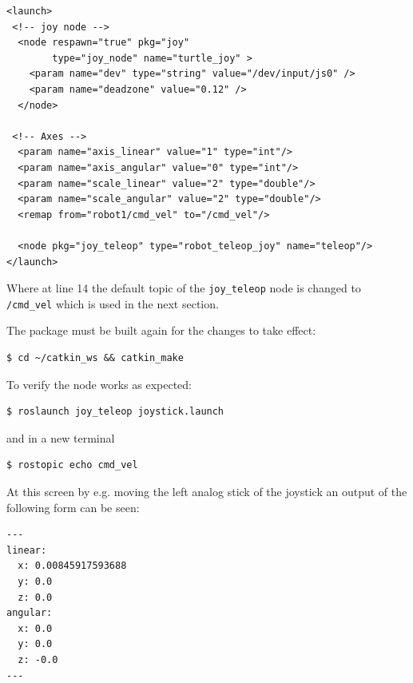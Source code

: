\begin{verbatim}
<launch>
 <!-- joy node -->
  <node respawn="true" pkg="joy"
        type="joy_node" name="turtle_joy" >
    <param name="dev" type="string" value="/dev/input/js0" />
    <param name="deadzone" value="0.12" />
  </node>

 <!-- Axes -->
  <param name="axis_linear" value="1" type="int"/>
  <param name="axis_angular" value="0" type="int"/>
  <param name="scale_linear" value="2" type="double"/>
  <param name="scale_angular" value="2" type="double"/>
  <remap from="robot1/cmd_vel" to="/cmd_vel"/> 
  
  <node pkg="joy_teleop" type="robot_teleop_joy" name="teleop"/>
</launch>
\end{verbatim}

\noindent Where at line 14 the default topic of the \texttt{joy\_teleop} node is changed to \texttt{/cmd\_vel} which is used in the next section.

\noindent The package must be built again for the changes to take effect:

\begin{mdframed}[backgroundcolor=light-gray, linecolor=light-gray]
\begin{verbatim}
$ cd ~/catkin_ws && catkin_make
\end{verbatim}
\end{mdframed}

\noindent To verify the node works as expected:
\begin{mdframed}[backgroundcolor=light-gray, linecolor=light-gray]
\begin{verbatim}
$ roslaunch joy_teleop joystick.launch
\end{verbatim}
\end{mdframed}

\noindent and in a new terminal
\begin{mdframed}[backgroundcolor=light-gray, linecolor=light-gray]
\begin{verbatim}
$ rostopic echo cmd_vel
\end{verbatim}
\end{mdframed}

\noindent At this screen by e.g. moving the left analog stick of the joystick an output of the following form can be seen:
\begin{verbatim}
---
linear: 
  x: 0.00845917593688
  y: 0.0
  z: 0.0
angular: 
  x: 0.0
  y: 0.0
  z: -0.0
---

\end{verbatim}

